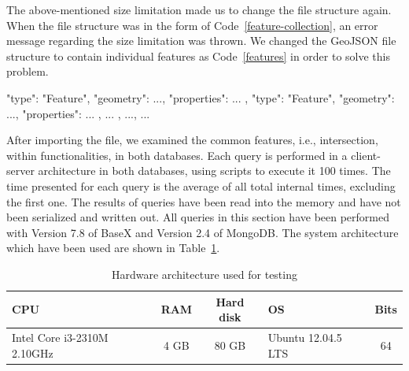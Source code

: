 \documentclass[a4paper,12pt]{article}
\begin{document}
The above-mentioned size limitation made us to change the file structure again.
When the file structure was in the form of Code~\ref{feature-collection}, 
an error message regarding the size limitation was thrown. 
We changed the GeoJSON file structure to contain individual features as Code~\ref{features} in order to solve this problem.
\vspace{10px}
\begin{fakeXML}[label=features,caption=A GeoJSON file restructured regarding the size limitation]
    {
      "type": "Feature",
      "geometry": {...},
      "properties": {...}
    },
    {
      "type": "Feature",
      "geometry": {...},
      "properties": {...}
    }, 
    { ... }, ..., { ... }
\end{fakeXML}
\vspace{10px}
After importing the file, we examined the common features, i.e., intersection, within functionalities, in both databases. Each query is performed in a client-server architecture in both databases, using scripts to execute it 100 times. The time presented for each query is the average of all total internal times, excluding the first one. The results of queries have been read into the memory and have not been serialized and written out. All queries in this section have been performed with Version 7.8 of BaseX and Version 2.4 of MongoDB. The system architecture which have been used are shown in Table~\ref{t.sysarchi}.

\begin{table}
\centering
\begin{tabular}{|l | c | c| l | c |}\hline
\textbf{CPU} & \textbf{RAM} & \textbf{Hard disk} & \textbf{OS} & \textbf{Bits}\\\hline
 Intel Core i3-2310M 2.10GHz & 4 GB & 80 GB & Ubuntu 12.04.5 LTS & 64\\\hline
\end{tabular}
\caption{Hardware architecture used for testing}
\label{t.sysarchi}
\end{table}
\end{document}
